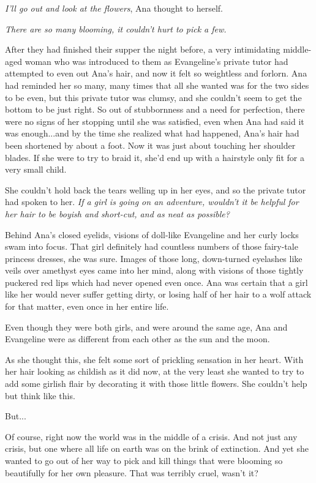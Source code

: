 \documentclass[
]{article}
\begin{document}
\emph{I'll go out and look at the flowers}, Ana thought to herself.

\emph{There are so many blooming, it couldn't hurt to pick a few.}

After they had finished their supper the night before, a very
intimidating middle-aged woman who was introduced to them as
Evangeline's private tutor had attempted to even out Ana's hair, and now
it felt so weightless and forlorn. Ana had reminded her so many, many
times that all she wanted was for the two sides to be even, but this
private tutor was clumsy, and she couldn't seem to get the bottom to be
just right. So out of stubbornness and a need for perfection, there were
no signs of her stopping until she was satisfied, even when Ana had said
it was enough...and by the time she realized what had happened, Ana's
hair had been shortened by about a foot. Now it was just about touching
her shoulder blades. If she were to try to braid it, she'd end up with a
hairstyle only fit for a very small child.

She couldn't hold back the tears welling up in her eyes, and so the
private tutor had spoken to her. \emph{If a girl is going on an
adventure, wouldn't it be helpful for her hair to be boyish and
short-cut, and as neat as possible?}

Behind Ana's closed eyelids, visions of doll-like Evangeline and her
curly locks swam into focus. That girl definitely had countless numbers
of those fairy-tale princess dresses, she was sure. Images of those
long, down-turned eyelashes like veils over amethyst eyes came into her
mind, along with visions of those tightly puckered red lips which had
never opened even once. Ana was certain that a girl like her would never
suffer getting dirty, or losing half of her hair to a wolf attack for
that matter, even once in her entire life.

Even though they were both girls, and were around the same age, Ana and
Evangeline were as different from each other as the sun and the moon.

As she thought this, she felt some sort of prickling sensation in her
heart. With her hair looking as childish as it did now, at the very
least she wanted to try to add some girlish flair by decorating it with
those little flowers. She couldn't help but think like this.

But...

Of course, right now the world was in the middle of a crisis. And not
just any crisis, but one where all life on earth was on the brink of
extinction. And yet she wanted to go out of her way to pick and kill
things that were blooming so beautifully for her own pleasure. That was
terribly cruel, wasn't it?
\end{document}
